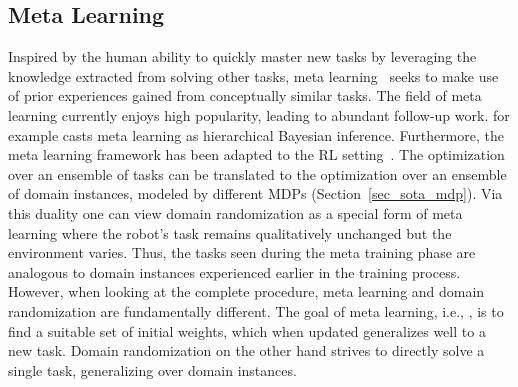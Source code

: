 \documentclass[utf8]{frontiersSCNS} %
\begin{document}
\subsection{Meta Learning}
\label{sec_sota_meta_learning}
Inspired by the human ability to quickly master new tasks by leveraging the knowledge extracted from solving other tasks, meta learning~\citep{Santoro_Lillicrap_16,Finn_Levine_17} seeks to make use of prior experiences gained from conceptually similar tasks.
%
The field of meta learning currently enjoys high popularity, leading to abundant follow-up work.
\citet{Grant_Griffiths_18} for example casts meta learning as hierarchical Bayesian inference.
Furthermore, the meta learning framework has been adapted to the \ac{RL} setting~\citep{Wang_Botvinick_17,Nagabandi_Clavera_Finn_19}.
The optimization over an ensemble of tasks can be translated to the optimization over an ensemble of domain instances, modeled by different \acp{MDP} (Section~\ref{sec_sota_mdp}).
Via this duality one can view domain randomization as a special form of meta learning where the robot's task remains qualitatively unchanged but the environment varies.
Thus, the tasks seen during the meta training phase are analogous to domain instances experienced earlier in the training process.
However, when looking at the complete procedure, meta learning and domain randomization are fundamentally different.
The goal of meta learning, i.e., \citet{Finn_Levine_17}, is to find a suitable set of initial weights, which when updated generalizes well to a new task.
Domain randomization on the other hand strives to directly solve a single task, generalizing over domain instances.

\end{document}
